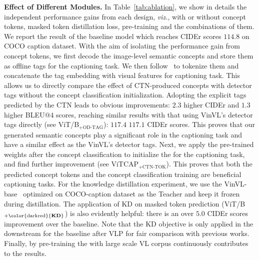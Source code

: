 \noindent \textbf{Effect of Different Modules.} \label{sec:module} In Table~\ref{tab:ablation}, we show in details the independent performance gains from each design, \textit{viz.}, with or without concept tokens, masked token distillation loss, pre-training and the combinations of them. 
We report the result of the baseline model 
which reaches CIDEr scores $114.8$ on COCO caption dataset. 
With the aim of isolating the performance gain from concept tokens, we first decode the image-level semantic concepts and store them as offline tags for the captioning task. We then follow~\citep{li2020oscar} to tokenize them and concatenate the tag embedding with visual features for captioning task. This allows us to directly compare the effect of CTN-produced concepts with detector tags without the concept classification initialization.
Adopting the explicit tags predicted by the CTN leads to obvious improvements: $2.3$ higher CIDEr and $1.3$ higher BLEU@$4$ scores, reaching similar results with that using VinVL's detector tags directly (see ViT/B$_\text{+OD-TAG}$): $117.4$ \vs $117.1$ CIDEr scores. This proves that our generated semantic concepts play a significant role in the captioning task and have a similar effect as the VinVL's detector tags. Next, we apply the pre-trained weights after the concept classification to initialize the \vitcap for the captioning task, and find further improvement (see ViTCAP${_\text{+CTN-TOK}}$). 
This proves that both the predicted concept tokens and the concept classification training are beneficial captioning tasks. 
For the knowledge distillation experiment, we use the VinVL-base~\citep{zhang2021multi} optimized on COCO-caption dataset as the Teacher and keep it frozen during distillation.
The application of KD on masked token prediction (ViT/B${_\text{+\color{darkred}{\textbf{KD}}}}$) is also evidently helpful: there is an over $5.0$ CIDEr scores improvement over the baseline. Note that the KD objective is only applied in the downstream for the \vitcap baseline after VLP for fair comparison with previous works. 
Finally, by pre-training the \vitcap with large scale VL corpus continuously contributes to the results.




